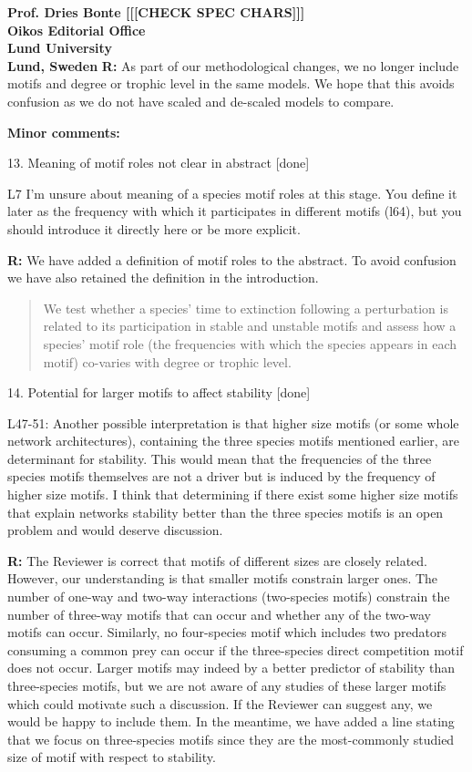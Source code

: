 \documentclass[12pt]{letter}
\begin{document}
\begin{letter}{\bf Prof. Dries Bonte [[[CHECK SPEC CHARS]]]\\
Oikos Editorial Office \\
Lund University \\
Lund, Sweden}
      \textbf{R:} As part of our methodological changes, we no longer include motifs and degree or trophic level in the same models. We hope that this avoids confusion as we do not have scaled and de-scaled models to compare.


  \textbf{Minor comments:}

    13. Meaning of motif roles not clear in abstract [done]

      L7  I’m unsure about meaning of a species motif roles at this stage. You define it later as the frequency with which it participates in different motifs (l64), but you should introduce it directly here or be more explicit.

      \textbf{R:} We have added a definition of motif roles to the abstract. To avoid confusion we have also retained the definition in the introduction.

      \begin{quotation}
       We test whether a species' time to extinction following a perturbation is related to its participation in stable and unstable motifs and assess how a species' motif role (the frequencies with which the species appears in each motif) co-varies with degree or trophic level.
      \end{quotation}


    14. Potential for larger motifs to affect stability [done]

      L47-51: Another possible interpretation is that higher size motifs (or some whole network architectures), containing the three species motifs mentioned earlier, are determinant for stability. This would mean that the frequencies of the three species motifs themselves are not a driver but is induced by the frequency of higher size motifs. I think that determining if there exist some higher size motifs that explain networks stability better than the three species motifs is an open problem and would deserve discussion.

      \textbf{R:} The Reviewer is correct that motifs of different sizes are closely related. However, our understanding is that smaller motifs constrain larger ones. The number of one-way and two-way interactions (two-species motifs) constrain the number of three-way motifs that can occur and whether any of the two-way motifs can occur. Similarly, no four-species motif which includes two predators consuming a common prey can occur if the three-species direct competition motif does not occur. Larger motifs may indeed by a better predictor of stability than three-species motifs, but we are not aware of any studies of these larger motifs which could motivate such a discussion. If the Reviewer can suggest any, we would be happy to include them. In the meantime, we have added a line stating that we focus on three-species motifs since they are the most-commonly studied size of motif with respect to stability.



\end{letter}
\end{document}
